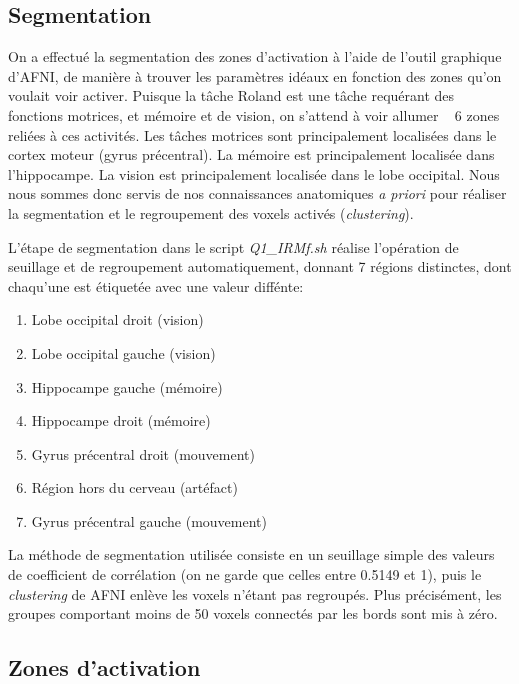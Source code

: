 \documentclass[a4paper]{article}
\begin{document}
\subsection{Segmentation}

On a effectué la segmentation des zones d'activation à l'aide de l'outil graphique d'AFNI, de manière à trouver les paramètres idéaux en fonction des zones qu'on voulait voir activer. Puisque la tâche Roland est une tâche requérant des fonctions motrices, et mémoire et de vision, on s'attend à voir \og allumer \fg~ 6 zones reliées à ces activités. Les tâches motrices sont principalement localisées dans le cortex moteur (gyrus précentral). La mémoire est principalement localisée dans l'hippocampe. La vision est principalement localisée dans le lobe occipital. Nous nous sommes donc servis de nos connaissances anatomiques \emph{a priori} pour réaliser la segmentation et le regroupement des voxels activés (\emph{clustering}).

L'étape de segmentation dans le script \emph{Q1\_IRMf.sh} réalise l'opération de seuillage et de regroupement automatiquement, donnant 7 régions distinctes, dont chaqu'une est étiquetée avec une valeur diffénte:
	
\begin{enumerate}
    \item Lobe occipital droit (vision)
    \item Lobe occipital gauche (vision)
    \item Hippocampe gauche (mémoire)
    \item Hippocampe droit (mémoire)
    \item Gyrus précentral droit (mouvement)
    \item Région hors du cerveau (artéfact)
    \item Gyrus précentral gauche (mouvement)
\end{enumerate}

La méthode de segmentation utilisée consiste en un seuillage simple des valeurs de coefficient de corrélation (on ne garde que celles entre 0.5149 et 1), puis le \emph{clustering} de AFNI enlève les voxels n'étant pas regroupés. Plus précisément, les groupes comportant moins de 50 voxels connectés par les bords sont mis à zéro.

\subsection{Zones d'activation}
\end{document}
